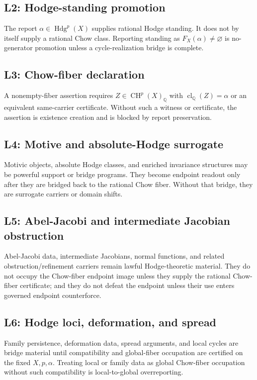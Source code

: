 \documentclass[11pt]{article}
\newcommand{\QQ}{\mathbb{Q}}
\newcommand{\CH}{\operatorname{CH}}
\newcommand{\Hdg}{\operatorname{Hdg}}
\newcommand{\clQ}{\operatorname{cl}_{\QQ}}
\begin{document}
\subsection*{L2: Hodge-standing promotion}
The report $\alpha\in\Hdg^p(X)$ supplies rational Hodge standing.  It does not by itself supply a rational Chow class.  Reporting standing as $F_X(\alpha)\neq\varnothing$ is no-generator promotion unless a cycle-realization bridge is complete.

\subsection*{L3: Chow-fiber declaration}
A nonempty-fiber assertion requires $Z\in\CH^p(X)_\QQ$ with $\clQ(Z)=\alpha$ or an equivalent same-carrier certificate.  Without such a witness or certificate, the assertion is existence creation and is blocked by report preservation.

\subsection*{L4: Motive and absolute-Hodge surrogate}
Motivic objects, absolute Hodge classes, and enriched invariance structures may be powerful support or bridge programs.  They become endpoint readout only after they are bridged back to the rational Chow fiber.  Without that bridge, they are surrogate carriers or domain shifts.

\subsection*{L5: Abel-Jacobi and intermediate Jacobian obstruction}
Abel-Jacobi data, intermediate Jacobians, normal functions, and related obstruction/refinement carriers remain lawful Hodge-theoretic material.  They do not occupy the Chow-fiber endpoint image unless they supply the rational Chow-fiber certificate; and they do not defeat the endpoint unless their use enters governed endpoint counterforce.

\subsection*{L6: Hodge loci, deformation, and spread}
Family persistence, deformation data, spread arguments, and local cycles are bridge material until compatibility and global-fiber occupation are certified on the fixed $X,p,\alpha$.  Treating local or family data as global Chow-fiber occupation without such compatibility is local-to-global overreporting.
\end{document}
